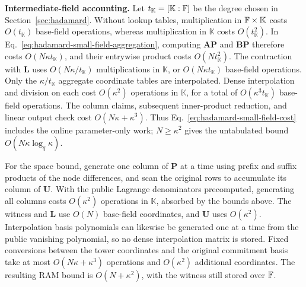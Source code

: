 \smallskip\noindent\textbf{Intermediate-field accounting.}
Let
\(t_{\mathbb K}=[\mathbb K:{\mathbb{F}}]\) be the degree chosen in
Section~\ref{sec:hadamard}. Without lookup tables, multiplication in
\({\mathbb{F}}\times\mathbb K\) costs \(O(t_{\mathbb K})\)
base-field operations, whereas multiplication in \(\mathbb K\)
costs \(O(t_{\mathbb K}^2)\).
In Eq.~\eqref{eq:hadamard-small-field-aggregation}, computing
\(\bm A\bm P\) and \(\bm B\bm P\) therefore costs
\(O(N\kappa t_{\mathbb K})\), and their entrywise product costs
\(O(Nt_{\mathbb K}^2)\).
The contraction with \(\bm L\) uses
\(O(N\kappa/t_{\mathbb K})\) multiplications in \(\mathbb K\),
or \(O(N\kappa t_{\mathbb K})\) base-field operations.
Only the \(\kappa/t_{\mathbb K}\) aggregate coordinate tables
are interpolated. Dense interpolation and division on each cost
\(O(\kappa^2)\) operations in \(\mathbb K\), for a total of
\(O(\kappa^3t_{\mathbb K})\) base-field operations.
The column claims, subsequent inner-product reduction, and linear
output check cost \(O(N\kappa+\kappa^3)\).
Thus Eq.~\eqref{eq:hadamard-small-field-cost} includes the
online parameter-only work; \(N\geq\kappa^2\) gives the
untabulated bound \(O(N\kappa\log_q\kappa)\).

For the space bound, generate one column of \(\bm P\) at a time
using prefix and suffix products of the node differences, and
scan the original rows to accumulate its column of \(\bm U\).
With the public Lagrange denominators precomputed, generating all
columns costs \(O(\kappa^2)\) operations in \(\mathbb K\),
absorbed by the bounds above. The witness and \(\bm L\) use
\(O(N)\) base-field coordinates, and \(\bm U\) uses
\(O(\kappa^2)\). Interpolation basis polynomials can likewise
be generated one at a time from the public vanishing polynomial,
so no dense interpolation matrix is stored.
Fixed conversions between the tower coordinates and the original
commitment basis take at most \(O(N\kappa+\kappa^3)\) operations
and \(O(\kappa^2)\) additional coordinates.
The resulting RAM bound is \(O(N+\kappa^2)\), with the witness
still stored over \({\mathbb{F}}\).

